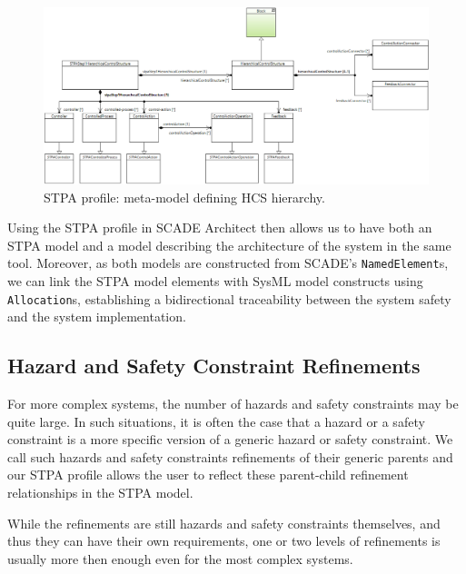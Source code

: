 \documentclass[conference]{IEEEtran}
\begin{document}
\begin{figure}[hbtp]
  \centering
  \includegraphics[scale=0.25]{fig/hcs_hierarchy_metamodel.png}
  \caption{STPA profile: meta-model defining HCS hierarchy.}
  \label{fig:hcs_hierarchy_metamodel}
\end{figure}

Using the STPA profile in SCADE Architect then allows us to have both an STPA
model and a model describing the architecture of the system in the same tool.
Moreover, as both models are constructed from SCADE's \texttt{NamedElement}s, we
can link the STPA model elements with SysML model constructs using
\texttt{Allocation}s, establishing a bidirectional traceability between the
system safety and the system implementation.

\subsection{Hazard and Safety Constraint Refinements}

For more complex systems, the number of hazards and safety constraints may be
quite large. In such situations, it is often the case that a hazard or a safety
constraint is a more specific version of a generic hazard or safety constraint.
We call such hazards and safety constraints refinements of their generic parents
and our STPA profile allows the user to reflect these parent-child refinement
relationships in the STPA model.

While the refinements are still hazards and safety constraints themselves, and
thus they can have their own requirements, one or two levels of refinements is
usually more then enough even for the most complex systems.

\end{document}
